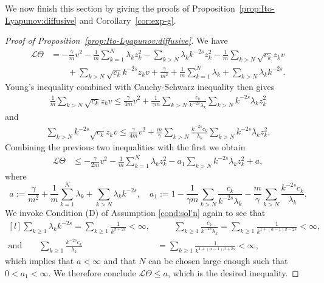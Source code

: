 \documentclass[11pt]{amsart}
\theoremstyle{definition}
\renewcommand{\L}{\mathcal{L}}
\theoremstyle{definition}
\theoremstyle{plain}
\numberwithin{equation}{section}
\begin{document}
We now finish this section by giving the proofs of Proposition~\ref{prop:Ito-Lyapunov:diffusive} and Corollary~\ref{cor:exp-g}.  
\begin{proof}[Proof of Proposition~\ref{prop:Ito-Lyapunov:diffusive}]
We have 
\begin{align*}
\L \Theta &= -\frac{\gamma}{m}v^2-\frac{1}{m}\sum_{k=1}^N\lambda_k z_k^2-\sum_{k>N}\lambda_k k^{-2s}z_k^2-\frac{1}{m}\sum_{k>N}\sqrt{c_k}z_k v\\
&\qquad+\sum_{k>N}\sqrt{c_k}k^{-2s}z_k v+ \frac{\gamma}{m^2}+\frac{1}{m}\sum_{k=1}^N\lambda_k+\sum_{k>N}\lambda_k k^{-2s} .  
\end{align*}
Young's inequality combined with Cauchy-Schwarz inequality then gives 
\begin{align*}
\frac{1}{m}\sum_{k>N}\sqrt{c_k}z_k v\leq \frac{\gamma}{4m}v^2+\frac{1}{\gamma m}\sum_{k>N}\frac{c_k}{k^{-2s}\lambda_k} \sum_{k>N}k^{-2s}\lambda_kz_k^2
\end{align*} 
and
\begin{align*}
\sum_{k>N}k^{-2s}\sqrt{c_k}z_k v\leq \frac{\gamma}{4m}v^2+\frac{m}{\gamma }\sum_{k>N}\frac{k^{-2s}c_k}{\lambda_k}\sum_{k>N}k^{-2s}\lambda_k z_k^2.
\end{align*} 
Combining the previous two inequalities with the first we obtain
\begin{equation}\label{ineq:Ito-Lyapunov:diffusive:4}
\begin{aligned}
\L \Theta &\leq -\frac{\gamma}{2m}v^2-\frac{1}{m}\sum_{k=1}^N\lambda_k z_k^2-a_1\sum_{k>N}k^{-2s}\lambda_kz_k^2 +a,
\end{aligned}
\end{equation}
where 
\begin{equation}\label{eqn:Ito-Lyapunov:diffusive:5}
a:=\frac{\gamma}{m^2}+\frac{1}{m}\sum_{k=1}^N\lambda_k+\sum_{k>N}\lambda_k k^{-2s} ,\quad a_1:=1-\frac{1}{\gamma m} \sum_{k>N}\frac{c_k}{k^{-2s}\lambda_k}-\frac{m}{\gamma }\sum_{k>N}\frac{k^{-2s}c_k}{\lambda_k}.
\end{equation}
We invoke Condition (D) of Assumption \ref{cond:sol'n} again to see that
\begin{equation*}
\begin{aligned}[l]
\sum_{k\geq 1}\lambda_k k^{-2s}=\sum_{k\geq 1}\frac{1}{k^{\beta+2s}}<\infty,&\qquad
\sum_{k\geq 1}\frac{c_k}{k^{-2s}\lambda_k}=\sum_{k\geq 1}\frac{1}{k^{1+(\alpha-1)\beta-2s}}<\infty,\\
\text{and}\qquad\sum_{k\geq 1}\frac{k^{-2s}c_k}{\lambda_k}&=\sum_{k\geq 1}\frac{1}{k^{1+(\alpha-1)\beta+2s}}<\infty,
\end{aligned}
\end{equation*}
which implies that $a<\infty$ and that $N$ can be chosen large enough such that $0<a_1<\infty$. We therefore conclude $\L \Theta \leq a$, which is the desired inequality.
\end{proof}
\end{document}

